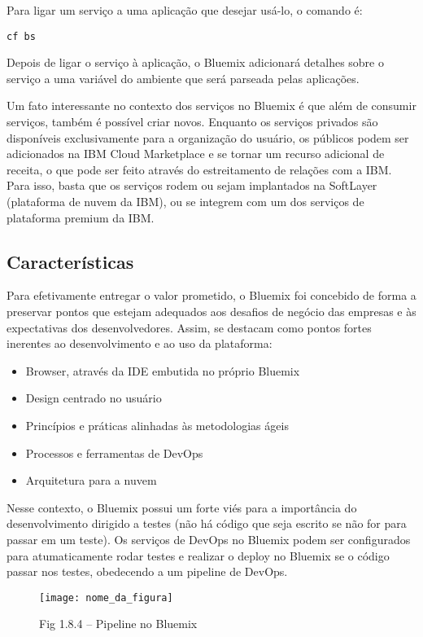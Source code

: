 Para ligar um serviço a uma aplicação que desejar usá-lo, o comando é:
\begin{lstlisting}
cf bs
\end{lstlisting}

Depois de ligar o serviço à aplicação, o Bluemix adicionará detalhes sobre o serviço a uma variável do ambiente que será parseada pelas aplicações.

Um fato interessante no contexto dos serviços no Bluemix é que além de consumir serviços, também é possível criar novos. Enquanto os serviços privados são disponíveis exclusivamente para a organização do usuário, os públicos podem ser adicionados na IBM Cloud Marketplace e se tornar um recurso adicional de receita, o que pode ser feito através do estreitamento de relações com a IBM. Para isso, basta que os serviços rodem ou sejam implantados na SoftLayer (plataforma de nuvem da IBM), ou se integrem com um dos serviços de plataforma premium da IBM.

\subsection{Características}

Para efetivamente entregar o valor prometido, o Bluemix foi concebido de forma a preservar pontos que estejam adequados aos desafios de negócio das empresas e às expectativas dos desenvolvedores. Assim, se destacam como pontos fortes inerentes ao desenvolvimento e ao uso da plataforma:
\begin{itemize}
    \item Browser, através da IDE embutida no próprio Bluemix
    \item  Design centrado no usuário
    \item  Princípios e práticas alinhadas às metodologias ágeis
    \item  Processos e ferramentas de DevOps
    \item  Arquitetura para a nuvem
\end{itemize}

Nesse contexto, o Bluemix possui um forte viés para a importância do desenvolvimento dirigido a testes (não há código que seja escrito se não for para passar em um teste). Os serviços de DevOps no Bluemix podem ser configurados para atumaticamente rodar testes e realizar o deploy no Bluemix se o código passar nos testes, obedecendo a um pipeline de DevOps.
\begin{figure}[!htb]
    \centering
    \texttt{[image: nome\_da\_figura]}
    \caption{Fig 1.8.4 – Pipeline no Bluemix}
    \label{Rotulo}
\end{figure}

